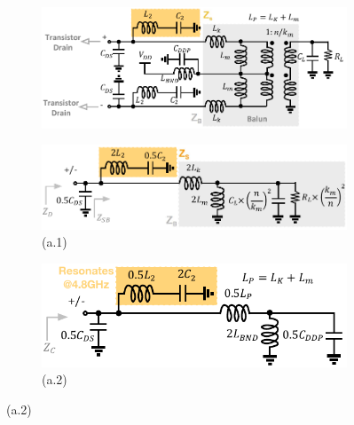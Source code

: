 \documentclass[conference]{IEEEtran}
\begin{document}
\begin{figure}[!t]
\captionsetup{font=footnotesize}
\centering
\begin{subfigure}{0.5\textwidth}
\centering
\includegraphics[width=1\textwidth]{Images/Design/Design_A_FC.pdf}
\caption{}
\label{fig:Design_A_FC}
\end{subfigure}
\begin{subfigure}[b]{0.35\textwidth}
\includegraphics[width=1\textwidth]{Images/Design/Design_A_Diff.pdf}
\caption*{(a.1)}
\label{fig:Design_A_Diff}
\end{subfigure}
\begin{subfigure}[b]{0.35\textwidth}
\includegraphics[width=1\textwidth]{Images/Design/Design_A_Com.pdf}
\caption*{(a.2)}
\label{fig:Design_A_Com}
\end{subfigure}


\end{figure}
\end{document}
